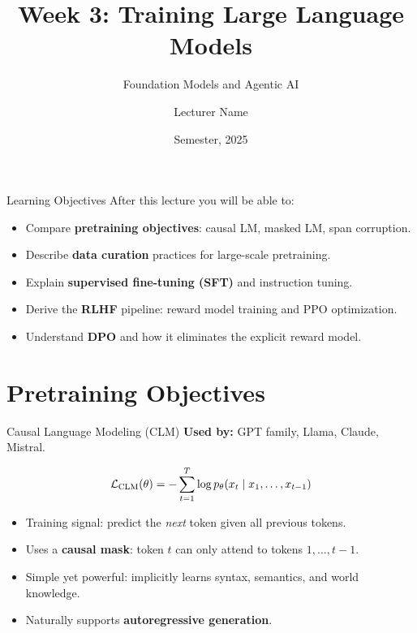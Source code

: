 \documentclass[aspectratio=169,10pt]{beamer}
\title{Week 3: Training Large Language Models}
\subtitle{Foundation Models and Agentic AI}
\author{Lecturer Name}
\institute{Holon Institute of Technology (HIT)}
\date{Semester, 2025}
\begin{document}
\begin{frame}
  \titlepage
\end{frame}

\begin{frame}{Learning Objectives}
  After this lecture you will be able to:
  \begin{itemize}
    \item Compare \textbf{pretraining objectives}: causal LM, masked LM, span corruption.
    \item Describe \textbf{data curation} practices for large-scale pretraining.
    \item Explain \textbf{supervised fine-tuning (SFT)} and instruction tuning.
    \item Derive the \textbf{RLHF} pipeline: reward model training and PPO optimization.
    \item Understand \textbf{DPO} and how it eliminates the explicit reward model.
  \end{itemize}
\end{frame}

\section{Pretraining Objectives}

\begin{frame}{Causal Language Modeling (CLM)}
  \textbf{Used by:} GPT family, Llama, Claude, Mistral.
  \begin{tcolorbox}[hitbox, title=Objective: Next-Token Prediction]
    \[
      \mathcal{L}_\text{CLM}(\theta) = -\sum_{t=1}^{T} \log p_\theta(x_t \mid x_1, \ldots, x_{t-1})
    \]
  \end{tcolorbox}
  \vspace{0.4em}
  \begin{itemize}
    \item Training signal: predict the \emph{next} token given all previous tokens.
    \item Uses a \textbf{causal mask}: token $t$ can only attend to tokens $1, \ldots, t-1$.
    \item Simple yet powerful: implicitly learns syntax, semantics, and world knowledge.
    \item Naturally supports \textbf{autoregressive generation}.
  \end{itemize}
\end{frame}
\end{document}
